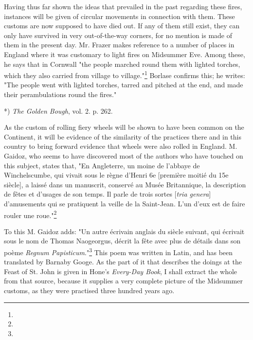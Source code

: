 \documentclass[a4paper, 11pt, oneside, polutonikogreek, english]{article}
\begin{document}
Having thus far shown the ideas that prevailed in the past regarding these fires, instances will be given of circular movements in connection with them. These customs are now supposed to have died out. If any of them still exist, they can only have survived in very out-of-the-way corners, for no mention is made of them in the present day. Mr. Frazer makes reference to a number of places in England where it was customary to light fires on Midsummer Eve. Among these, he says that in Cornwall "the people marched round them with lighted torches, which they also carried from village to village."\footnote{} Borlase confirms this; he writes: "The people went with lighted torches, tarred and pitched at the end, and made their perambulations round the fires."

*) \emph{The Golden Bough}, vol. 2. p. 262.

As the custom of rolling fiery wheels will be shown to have been common on the Continent, it will be evidence of the similarity of the practices there and in this country to bring forward evidence that wheels were also rolled in England. M. Gaidoz, who seems to have discovered most of the authors who have touched on this subject, states that, "En Angleterre, un moine de l'abbaye de Winchelscumbe, qui vivait sous le règne d'Henri 6e [première moitié du 15e siècle], a laissé dans un manuscrit, conservé au Musée Britannique, la description de fêtes et d'usages de son temps. Il parle de trois sortes [\emph{tria genera}] d'amusements qui se pratiquent la veille de la Saint-Jean. L'un d'eux est de faire rouler une roue."\footnote{}

To this M. Gaidoz adds: "Un autre écrivain anglais du siècle suivant, qui écrivait sous le nom de Thomas Naogeorgus, décrit la fête avec plus de détails dans son poème \emph{Regnum Papisticum}."\footnote{} This poem was written in Latin, and has been translated by Barnaby Googe. As the part of it that describes the doings at the Feast of St. John is given in Hone's \emph{Every-Day Book}, I shall extract the whole from that source, because it supplies a very complete picture of the Midsummer customs, as they were practised three hundred years ago.
\end{document}

